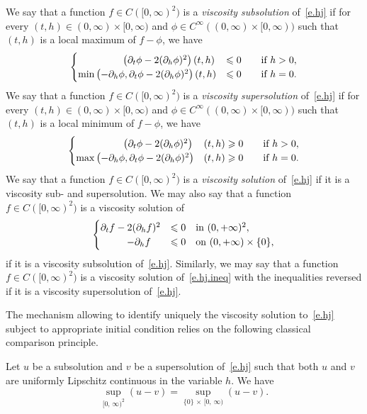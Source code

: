 \documentclass[AHL,Unicode,longabstracts,published]{cedram}
\newcommand{\1}{\mathds{1}}
\renewcommand{\le}{\leqslant}
\renewcommand{\ge}{\geqslant}
\begin{document}
\begin{defi}\label{def.visc}
We say that a function $f \in C([0,\infty)^2)$ is a \emph{viscosity subsolution} of~\eqref{e.hj} if for every $(t,h) \in (0,\infty)\times [0,\infty)$ and $\phi \in C^\infty((0,\infty)\times [0,\infty))$ such that $(t,h)$ is a local maximum of $f-\phi$, we have
\[
\begin{cases}
\mkern82mu\left(\partial_t \phi - 2(\partial_h \phi)^2\right)(t,h)& \le 0  \qquad \text{if } h > 0, \\
\min \left(-\partial_h \phi,\partial_t \phi - 2(\partial_h \phi)^2 \right)(t,h)& \le 0  \qquad \text{if } h = 0.
\end{cases}
\]
We say that a function $f \in C([0,\infty)^2)$ is a \emph{viscosity supersolution} of~\eqref{e.hj} if for every $(t,h) \in (0,\infty)\times [0,\infty)$ and $\phi \in C^\infty((0,\infty)\times [0,\infty))$ such that $(t,h)$ is a local minimum of $f-\phi$, we have
\[
\begin{cases}
\mkern86mu\left(\partial_t \phi - 2(\partial_h \phi)^2\right)&(t,h) \ge 0  \qquad \text{if } h > 0, \\
\max \left(-\partial_h \phi, \partial_t \phi - 2(\partial_h \phi)^2\right)&(t,h) \ge 0  \qquad \text{if } h = 0.
\end{cases}
\]
We say that a function $f \in C([0,\infty)^2)$ is a \emph{viscosity solution} of~\eqref{e.hj} if it is a viscosity sub- and supersolution. We may also say that a function $f \in C([0,\infty)^2)$ is a viscosity solution of
\begin{equation}\label{e.hj.ineq}
\begin{cases}
\partial_t f - 2(\partial_{h} f)^2 & \le 0 \quad \text{in } (0,+\infty)^2, \\
\mkern48mu- \partial_h f & \le 0 \quad  \text{on } (0,+\infty) \times \{0\},
\end{cases}
\end{equation}
if it is a viscosity subsolution of~\eqref{e.hj}. Similarly, we may say that a function $f \in C([0,\infty)^2)$ is a viscosity solution of~\eqref{e.hj.ineq} with the inequalities reversed if it is a viscosity supersolution of~\eqref{e.hj}.
\end{defi}

The mechanism allowing to identify uniquely the viscosity solution to~\eqref{e.hj} subject to appropriate initial condition relies on the following classical comparison principle.

\begin{prop}\label{p.comparison}
Let $u$ be a subsolution and $v$ be a supersolution of~\eqref{e.hj} such that both $u$ and $v$ are uniformly Lipschitz continuous in the variable $h$. We have
\[
\sup_{[0,\,\infty)^2} (u-v) = \sup_{\{0\}\,\times\,[0,\,\infty)} (u-v).
\]
\end{prop}
\end{document}
